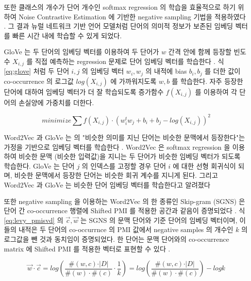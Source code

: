 \documentclass[11pt]{article}
\begin{document}
또한 클래스의 개수가 단어 개수인 softmax regression 의 학습을 효율적으로 하기 위하여 Noise Contrastive Estimation \citep{gutmann2010noise} 에 기반한 negative sampling 기법을 적용하였다 \citep{mikolov2013distributed}.
그 결과 뉴럴 네트워크 기반 언어 모델처럼 단어의 의미적 정보가 보존된 임베딩 벡터를 빠른 시간 내에 학습할 수 있게 되었다.

GloVe 는 두 단어의 임베딩 벡터를 이용하여 두 단어가 $w$ 간격 안에 함께 등장할 빈도수 $X_{i,j}$ 를 직접 예측하는 regression 문제로 단어 임베딩 벡터를 학습한다 \citep{pennington2014glove}.
식 \ref{eq:glove} 처럼 두 단어 $i, j$ 의 임베딩 벡터 $w_i, w_j$ 의 내적에 bias $b_i, b_j$ 를 더한 값이 co-occurrence 의 로그값 $log(X_{i,j})$ 에 가까워지도록 $w, b$ 를 학습한다.
자주 등장한 단어에 대하여 임베딩 벡터가 더 잘 학습되도록 증가함수 $f(X_{i,j})$ 를 이용하여 각 단어의 손실양에 가중치를 더한다.

\begin{equation}
  \label{eq:glove}
  minimize \sum f(X_{i,j}) \cdot \left( w_i^t w_j + b_i + b_j - log(X_{i,j}) \right)^2
\end{equation}

Word2Vec 과 GloVe 는 \citep{harris1954distributional} 의 "비슷한 의미를 지닌 단어는 비슷한 문맥에서 등장한다"는 가정을 기반으로 임베딩 벡터를 학습한다 .
Word2Vec 은 softmax regression 을 이용하여 비슷한 문맥 (비슷한 입력값)을 지니는 두 단어가 비슷한 임베딩 벡터가 되도록 학습한다.
GloVe 는 단어 $j$ 의 인덱스를 고정할 경우 단어 $i$ 에 대한 선형 회귀식이 되며, 비슷한 문맥에서 등장한 단어는 비슷한 회귀 계수를 지니게 된다.
그리고 Word2Vec 과 GloVe 는 비슷한 단어 임베딩 벡터를 학습한다고 알려졌다 \citep{levy2015improving}

또한 negative sampling 을 이용하는 Word2Vec 의 한 종류인 Skip-gram (SGNS) 은 단어 간 co-occurrence 행렬에 Shifted PMI 를 적용한 공간과 같음이 증명되었다 \citep{levy2014neural}.
식 \ref{eq:levy_pmisvd} 의 $\vec{c}, \vec{w}$ 는 SGNS 의 문맥 단어와 기준 단어의 임베딩 벡터이며, 이들의 내적은 두 단어의 co-occurrnce 의 PMI 값에서 negative samples 의 개수인 $k$ 의 로그값을 뺀 것과 동치임이 증명되었다.
한 단어는 문맥 단어와의 co-occurrence matrix 에 Shifted PMI 를 적용한 벡터로 표현할 수 있다 \citep{levy2014neural}.

\begin{equation}
  \label{eq:levy_pmisvd}
  \vec{w} \cdot \vec{c} = log \left( \frac{\#(w,c) \cdot \vert D \vert}{\#(w) \cdot \#(c)} \cdot \frac{1}{k} \right) = log \left( \frac{\#(w,c) \cdot \vert D \vert}{\#(w) \cdot \#(c)} \right) - log k
\end{equation}
\end{document}

